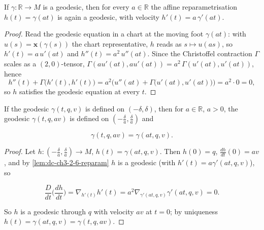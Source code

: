 \begin{lemma}
  \label{lem:dc-ch3-2-6-reparam}
  \leanok
  If $\gamma:\mathbb{R}\to M$ is a geodesic, then for every $a\in\mathbb{R}$ the
  affine reparametrisation $h(t)=\gamma(at)$ is again a geodesic, with velocity
  $h'(t)=a\,\gamma'(at)$.
\end{lemma}
\begin{proof}
  \sketch
  \leanok
  Read the geodesic equation in a chart at the moving foot $\gamma(at)$: with
  $u(s)=\mathbf{x}(\gamma(s))$ the chart representative, $h$ reads as $s\mapsto
  u(as)$, so $h'(t)=a\,u'(at)$ and $h''(t)=a^2\,u''(at)$. Since the Christoffel
  contraction $\Gamma$ scales as a $(2,0)$-tensor,
  $\Gamma(au'(at),au'(at))=a^2\,\Gamma(u'(at),u'(at))$, hence
  $$
  h''(t)+\Gamma\big(h'(t),h'(t)\big)
    =a^2\Big(u''(at)+\Gamma\big(u'(at),u'(at)\big)\Big)=a^2\cdot 0=0,
  $$
  so $h$ satisfies the geodesic equation at every $t$.
\end{proof}

\begin{lemma}
  \label{lem:dc-ch3-2-6}
  \leanok
  If the geodesic $\gamma(t,q,v)$ is defined on $(-\delta,\delta)$, then for
  $a\in\mathbb{R}$, $a>0$, the geodesic $\gamma(t,q,av)$ is defined on
  $(-\frac{\delta}{a},\frac{\delta}{a})$ and

  $$
  \gamma(t,q,av)=\gamma(at,q,v).
  $$
\end{lemma}
\begin{proof}
  \sketch
  \leanok
  Let $h:(-\frac{\delta}{a},\frac{\delta}{a})\to M$, $h(t)=\gamma(at,q,v)$.
  Then $h(0)=q$, $\frac{dh}{dt}(0)=av$, and by \cref{lem:dc-ch3-2-6-reparam}
  $h$ is a geodesic (with $h'(t)=a\gamma'(at,q,v)$), so

  $$
  \frac{D}{dt}\Big(\frac{dh}{dt}\Big)=\nabla_{h'(t)}h'(t)=a^2\nabla_{\gamma'(at,q,v)}\gamma'(at,q,v)=0.
  $$

  So $h$ is a geodesic through $q$ with velocity $av$ at $t=0$; by uniqueness
  $h(t)=\gamma(at,q,v)=\gamma(t,q,av)$.
\end{proof}

